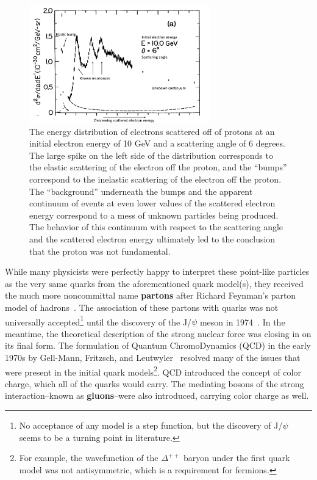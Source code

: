 \begin{figure}[ht]
    \centering
    \includegraphics[width=0.7\textwidth]{figures/introduction/DeepInelasticScattering.png}
    \caption{The energy distribution of electrons scattered off of protons at an initial electron energy of 10 GeV and a scattering angle of 6 degrees. The large spike on the left side of the distribution corresponds to the elastic scattering of the electron off the proton, and the ``bumps'' correspond to the inelastic scattering of the electron off the proton. The ``background'' underneath the bumps and the apparent continuum of events at even lower values of the scattered electron energy correspond to a mess of unknown particles being produced. The behavior of this continuum with respect to the scattering angle and the scattered electron energy ultimately led to the conclusion that the proton was not fundamental.}
    \label{fig:dis}
\end{figure}

While many physicists were perfectly happy to interpret these point-like particles as the very same quarks from the aforementioned quark model(s), they received the much more noncommittal name \textbf{partons} after Richard Feynman's parton model of hadrons~\cite{Partons}. The association of these partons with quarks was not universally accepted\footnote{No acceptance of any model is a step function, but the discovery of J/$\psi$ seems to be a turning point in literature.} until the discovery of the J/$\psi$ meson in 1974~\cite{Jpsi}. In the meantime, the theoretical description of the strong nuclear force was closing in on its final form. The formulation of Quantum ChromoDynamics (QCD) in the early 1970s by Gell-Mann, Fritzsch, and Leutwyler~\cite{QCDFormulation} resolved many of the issues that were present in the initial quark models\footnote{For example, the wavefunction of the $\Delta^{++}$ baryon under the first quark model was not antisymmetric, which is a requirement for fermions.}. QCD introduced the concept of color charge, which all of the quarks would carry. The mediating bosons of the strong interaction--known as \textbf{gluons}--were also introduced, carrying color charge as well.

